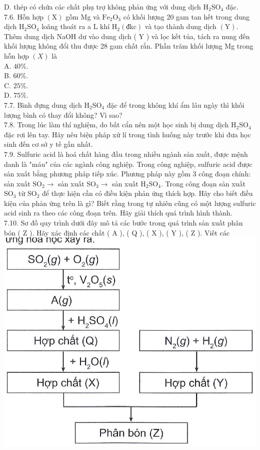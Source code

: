 \documentclass[10pt]{article}
\begin{document}
D. thép có chứa các chất phụ trợ không phản ứng với dung dịch $\mathrm{H}_{2} \mathrm{SO}_{4}$ đặc.\\
7.6. Hỗn hợp $(\mathrm{X})$ gồm Mg và $\mathrm{Fe}_{2} \mathrm{O}_{3}$ có khối lượng 20 gam tan hết trong dung dịch $\mathrm{H}_{2} \mathrm{SO}_{4}$ loãng thoát ra a L khí $\mathrm{H}_{2}(\mathrm{đkc})$ và tạo thành dung dịch $(\mathrm{Y})$. Thêm dung dịch NaOH dư vào dung dịch ( Y ) và lọc kết tủa, tách ra nung đến khối lượng không đổi thu được 28 gam chất rắn. Phần trăm khối lượng Mg trong hỗn hợp $(X)$ là\\
A. $40 \%$.\\
B. $60 \%$.\\
C. $25 \%$.\\
D. $75 \%$.\\
7.7. Bình đựng dung dịch $\mathrm{H}_{2} \mathrm{SO}_{4}$ đặc để trong không khí ẩm lâu ngày thì khối lượng bình có thay đổi không? Vì sao?\\
7.8. Trong lúc làm thí nghiệm, do bất cẩn nên một học sinh bị dung dịch $\mathrm{H}_{2} \mathrm{SO}_{4}$ đặc rơi lên tay. Hãy nêu biện pháp xử lí trong tình huống này trước khi đưa học sinh đến cơ sở y tế gần nhất.\\
7.9. Sulfuric acid là hoá chất hàng đầu trong nhiều ngành sản xuất, được mệnh danh là "máu" của các ngành công nghiệp. Trong công nghiệp, sulfuric acid được sản xuất bằng phương pháp tiếp xúc. Phương pháp này gồm 3 công đoạn chính: sản xuất $\mathrm{SO}_{2} \rightarrow$ sản xuất $\mathrm{SO}_{3} \rightarrow$ sản xuất $\mathrm{H}_{2} \mathrm{SO}_{4}$. Trong công đoạn sản xuất $\mathrm{SO}_{3}$ từ $\mathrm{SO}_{2}$ để thực hiện cần có điều kiện phản ứng thích hợp. Hãy cho biết điều kiện của phản ứng trên là gì? Biết rằng trong tự nhiên cũng có một lượng sulfuric acid sinh ra theo các công đoạn trên. Hãy giải thích quá trình hình thành.\\
7.10. Sơ đồ quy trình dưới đây mô tả các bước trong quá trình sản xuất phân bón ( Z ). Hãy xác định các chất ( A ), ( Q ), ( X ), ( Y ), ( Z ). Viết các\\
\includegraphics[max width=\textwidth, center]{2025_10_23_ae7aef68fb3b41082d29g-12}\\
\end{document}
